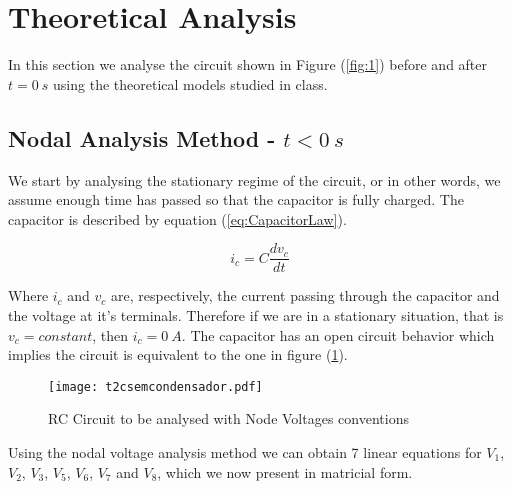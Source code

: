 \section{Theoretical Analysis}
\label{sec:analysis}

In this section we analyse the circuit shown in Figure (\ref{fig:1}) before and 
after $t = 0 \:s$ using the theoretical models studied in class.

\subsection{Nodal Analysis Method - $t < 0 \:s$}
\label{se:2.1}

We start by analysing the stationary regime of the circuit, or in 
other words, we assume enough time has passed
so that the capacitor is fully charged.
The capacitor is described by 
equation (\ref{eq:CapacitorLaw}).

\begin{equation}
  i_c = C \frac{d v_c}{dt}
  \label{eq:CapacitorLaw}
\end{equation}

Where $i_c$ and $v_c$ are, respectively, the current passing through the capacitor and the voltage at
it's terminals. Therefore if we are in a stationary situation, that is $v_c = constant$, then $i_c = 0 \: A$. 
The capacitor has an open circuit behavior which implies the circuit is equivalent to the one 
in figure (\ref{fig:2}).

\begin{figure}[H] \centering
  \texttt{[image: t2csemcondensador.pdf]}
  \caption{RC Circuit to be analysed with Node Voltages conventions}
  \label{fig:2}
\end{figure}

Using the nodal voltage analysis method we can obtain 7 linear equations for $V_1$, $V_2$, $V_3$, $V_5$, $V_6$, $V_7$ and $V_8$,
which we now present in matricial form.

